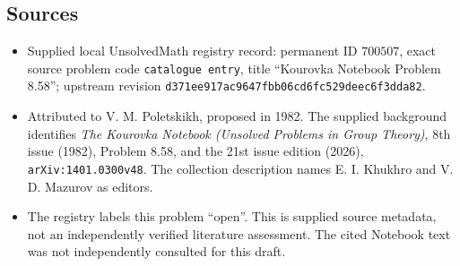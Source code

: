 \documentclass[11pt]{article}
\begin{document}
\subsection{Sources}
\begin{itemize}
\item Supplied local UnsolvedMath registry record: permanent ID \(700507\), exact source problem code \texttt{catalogue entry}, title ``Kourovka Notebook Problem 8.58''; upstream revision \texttt{d371ee917ac9647fbb06cd6fc529deec6f3dda82}.
\item Attributed to V. M. Poletskikh, proposed in 1982. The supplied background identifies \emph{The Kourovka Notebook (Unsolved Problems in Group Theory)}, 8th issue (1982), Problem 8.58, and the 21st issue edition (2026), \texttt{arXiv:1401.0300v48}. The collection description names E. I. Khukhro and V. D. Mazurov as editors.
\item The registry labels this problem ``open''. This is supplied source metadata, not an independently verified literature assessment. The cited Notebook text was not independently consulted for this draft.
\end{itemize}
\end{document}
